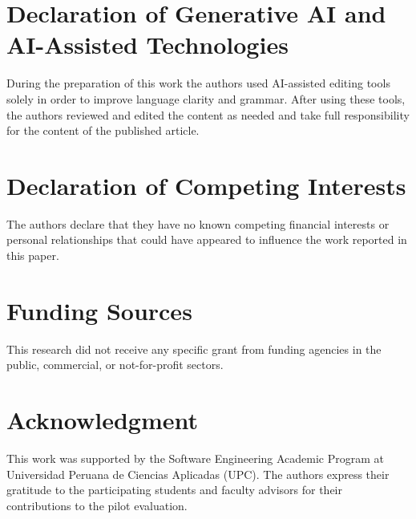 \documentclass[a4paper,fleqn]{cas-dc}
\begin{document}
\section*{Declaration of Generative AI and AI-Assisted Technologies}
During the preparation of this work the authors used AI-assisted editing tools solely in order to improve language clarity and grammar. After using these tools, the authors reviewed and edited the content as needed and take full responsibility for the content of the published article.

\section*{Declaration of Competing Interests}
The authors declare that they have no known competing financial interests or personal relationships that could have appeared to influence the work reported in this paper.

\section*{Funding Sources}
This research did not receive any specific grant from funding agencies in the public, commercial, or not-for-profit sectors.

\section*{Acknowledgment}
This work was supported by the Software Engineering Academic Program at Universidad Peruana de Ciencias Aplicadas (UPC). The authors express their gratitude to the participating students and faculty advisors for their contributions to the pilot evaluation.



\end{document}
